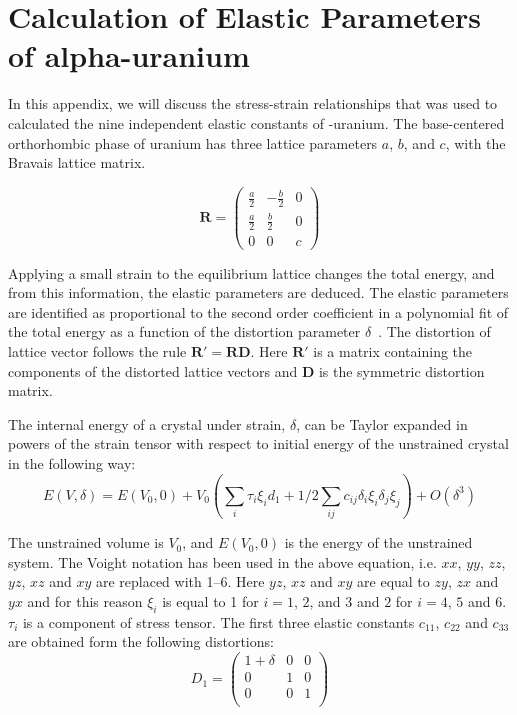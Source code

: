 \chapter{Calculation of Elastic Parameters of alpha-uranium}\label{appen_elalpha}

In this appendix, we will discuss the stress-strain relationships that was used to calculated the nine independent elastic constants of \textalpha-uranium. The base-centered orthorhombic phase of uranium has three lattice parameters $a$, $b$, and $c$, with the Bravais lattice matrix.

\begin{equation}\label{eq_lattic_alphaU}
\mathbf{R} = \begin{pmatrix}
			\frac{a}{2} & -\frac{b}{2} & 0 \\
			\frac{a}{2} & \frac{b}{2} & 0 \\
			0			&    0        & c 
			\end{pmatrix}
\end{equation}

Applying a small strain to the equilibrium lattice changes the total energy, and from this information, the elastic parameters are deduced. The elastic parameters are identified as proportional to the second order coefficient in a polynomial fit of the total energy as a function of the distortion parameter $\delta$~\cite{wallace1998thermodynamics}. The distortion of lattice vector follows the rule $\mathbf{R'}=\mathbf{RD}$. Here $\mathbf{R'}$ is a matrix containing the components of the distorted lattice vectors and $\mathbf{D}$ is the symmetric distortion matrix.



The internal energy of a crystal under strain, $\delta$, can be Taylor expanded in powers of the strain tensor with respect to initial energy of the unstrained crystal in the following way:
	\begin{equation}
	\label{eq_taylor_el}
	E(V,\delta) = E(V_0,0) + V_0 \left ( \sum_i \tau_i \xi_i d_1 + 1/2 \sum_{ij} c_{ij} \delta_i \xi_i \delta_j \xi_j \right ) + O(\delta^3) 
	\end{equation}

The unstrained volume is $V_0$, and $E(V_0,0)$ is the energy of the unstrained system. The Voight notation has been used in the above equation, i.e. $xx$, $yy$, $zz$, $yz$, $xz$ and $xy$ are replaced with 1--6. Here $yz$, $xz$ and $xy$ are equal to $zy$, $zx$ and $yx$ and for this reason $\xi_i$ is equal to 1 for $i=1$, $2$, and $3$ and $2$ for $i=4$, $5$ and $6$. $\tau_i$ is a component of stress tensor. The first three elastic constants $c_{11}$, $c_{22}$ and $c_{33}$ are obtained form the following distortions:
\begin{equation}
\label{eq_D1}
	D_1 =  \begin{pmatrix}
						1+\delta & 0 & 0 \\
						0 & 1 & 0 \\
						0 & 0 & 1 \\
						\end{pmatrix}
\end{equation}

